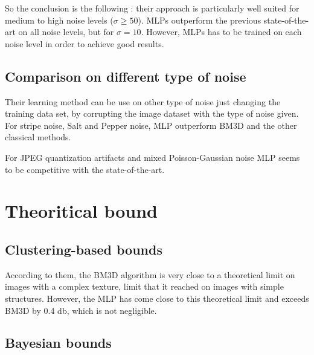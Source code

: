 \documentclass[10pt,a4paper]{article}
\newcommand{\svs}{\vspace{9pt}}
\begin{document}
\svs

So the conclusion is the following : their approach is particularly well suited for medium to high noise
levels ($\sigma \geq 50$). MLPs outperform the previous state-of-the-art on all noise levels, but for $\sigma = 10$. However, MLPs has to be trained on each noise level in order to achieve good results.

\svs

\subsection{Comparison on different type of noise}


Their learning method can be use on other type of noise just changing the training data set, by corrupting the image dataset with the type of noise given. For stripe noise, Salt and Pepper noise, MLP outperform BM3D and the other classical methods.

For JPEG quantization artifacts and mixed Poisson-Gaussian noise MLP seems to be competitive with the state-of-the-art.

\section{Theoritical bound}
\subsection{Clustering-based bounds}

According to them, the BM3D algorithm is very close to a theoretical limit on images with a complex texture, limit that it reached on images with simple structures. However, the MLP has come close to this theoretical limit and exceeds BM3D by 0.4 db, which is not negligible.

\subsection{Bayesian bounds}
\end{document}
